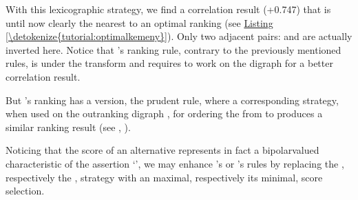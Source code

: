 \documentclass[a4paper,12pt,english]{sphinxhowto}
\begin{document}
With this  lexicographic  strategy, we find a correlation result (+0.747) that is until now clearly the nearest to an optimal  ranking (see \hyperref[\detokenize{tutorial:optimalkemeny}]{Listing \ref{\detokenize{tutorial:optimalkemeny}}}). Only two adjacent pairs: \sphinxstyleemphasis{{[}a6, a7{]}} and \sphinxstyleemphasis{{[}a8, a9{]}} are actually inverted here. Notice that ’s ranking rule, contrary to the previously mentioned rules, is   under the  transform and requires to work on the  digraph  for a better correlation result.

\begin{sphinxVerbatim}[commandchars=\\\{\},numbers=left,firstnumber=1,stepnumber=1]
\end{sphinxVerbatim}

But ’s ranking has a  version, the prudent   rule, where a corresponding  strategy, when used on the  outranking digraph , for ordering the from  to  produces a similar ranking result (see , ).

Noticing that the  score of an alternative  represents in fact a bipolar\sphinxhyphen{}valued characteristic of the assertion ‘’, we may enhance ’s or ’s rules by replacing the , respectively the , strategy with an  maximal, respectively its  minimal,  score selection.
\end{document}
